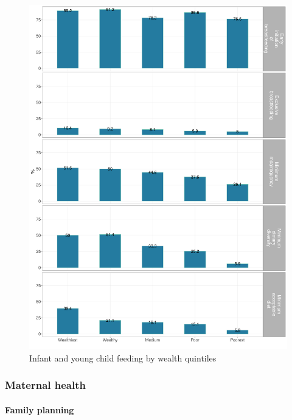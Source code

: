 \documentclass[12pt,a4paper]{article}
\let\oldparagraph\paragraph
\renewcommand{\paragraph}[1]{\oldparagraph{#1}\mbox{}}
\begin{document}
\begin{figure}[H]

{\centering \includegraphics{kayahReport_files/figure-latex/iycf2plot-1} 

}

\caption{Infant and young child feeding by wealth quintiles}\label{fig:iycf2plot}
\end{figure}

\hypertarget{mhealth-results}{%
\subsubsection{Maternal health}\label{mhealth-results}}

\hypertarget{fplan-results}{%
\paragraph{Family planning}\label{fplan-results}}
\end{document}
